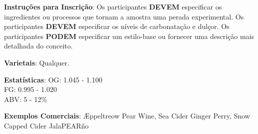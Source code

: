 \textbf{Instruções para Inscrição}: Os participantes \textbf{DEVEM} especificar os ingredientes ou processos que tornam a amostra uma perada experimental. Os participantes \textbf{DEVEM} especificar os níveis de carbonatação e dulçor. Os participantes \textbf{PODEM} especificar um estilo-base ou fornecer uma descrição mais detalhada do conceito.

\textbf{Varietais}: Qualquer.

\textbf{Estatísticas}: OG: 1.045 - 1.100 \\
\phantom{ } \hspace{16.5mm} FG: 0.995 - 1.020 \\
\phantom{ } \hspace{16.5mm} ABV: 5 - 12\%

\textbf{Exemplos Comerciais}: Æppeltreow Pear Wine, Sea Cider Ginger Perry, Snow Capped Cider JalaPEARño
